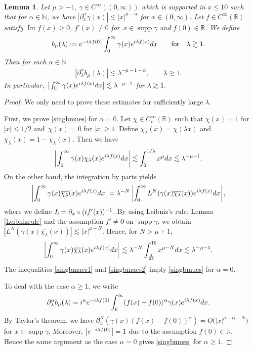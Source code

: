 \documentclass[10pt,a4paper]{article}
\numberwithin{equation}{section}
\newtheorem{Lemma}[Theorem]{Lemma}
\def\R{\mathbb{R}}%
\DeclareMathOperator{\supp}{supp}%
\DeclareMathOperator{\im}{Im}%
\def\a{\alpha}
\def\c{\gamma}
\def\l{\lambda}
\def\m{\mu}
\def\pa{\partial}
\begin{document}
\begin{Lemma}\label{singularasym}
Let $\m>-1$, $\c\in C^{\infty}((0,\infty))$ which is supported in $x\leq 10$ such that for $\a\in\mathbb{N}$, we have $|\pa_x^{\a}\c(x)|\lesssim |x|^{\m-\a}$ for $x\in (0,\infty)$. Let $f\in C^{\infty}(\R)$ satisfy $\im f(x)\geq 0$, $f'(x)\neq 0$ for~${x\in \supp \c}$ and $f(0)\in \R$. We define
\begin{align*}
b_{\m}(\l):={\rm e}^{-{\rm i}\l f(0)}\int_{0}^{\infty}\c(x){\rm e}^{{\rm i}\l f(x)}{\rm d}x\qquad \text{for}\quad \l\gtrsim 1.
\end{align*}
Then for each $\a\in\mathbb{N}$
\begin{align}\label{singbmues}
|\partial_{\l}^{\a}b_{\m}(\l)|\lesssim \l^{-\m-1-\a},\qquad \l\gtrsim 1.
\end{align}
In particular, $\big|\int_{0}^{\infty}\c(x){\rm e}^{{\rm i}\l f(x)}{\rm d}x\big|\lesssim \l^{-\m-1}$ for $\l\gtrsim 1$.
\end{Lemma}

\begin{proof}
We only need to prove these estimates for sufficiently large $\l$.

First, we prove \eqref{singbmues} for $\a=0$. Let $\chi\in C_c^{\infty}(\R)$ such that $\chi(x)=1$ for $|x|\leq 1/2$ and~${\chi(x)=0}$ for $|x|\geq 1$. Define $\chi_{\l}(x)=\chi(\l x)$ and $\overline{\chi_\l}(x)=1-\chi_{\l}(x)$. Then we have
\begin{align}\label{singbmues1}
\left|\int_{0}^{\infty}\c(x)\chi_{\l}(x){\rm e}^{{\rm i}\l f(x)}{\rm d}x\right|\lesssim \int_{0}^{1/\l}x^{\m}{\rm d}x\lesssim {\l}^{-\m-1}.
\end{align}
On the other hand, the integration by parts yields
\begin{align*}
\left|\int_{0}^{\infty}\c(x)\overline{\chi_{\l}}(x){\rm e}^{{\rm i}\l f(x)}{\rm d}x\right|=\l^{-N}\left|\int_{0}^{\infty}L^N(\c(x)\overline{\chi_{\l}}(x)){\rm e}^{{\rm i}\l f(x)}{\rm d}x\right|,
\end{align*}
where we define $L=\pa_x\circ ({\rm i}f'(x))^{-1}$. By using Leibniz's rule, Lemma \ref{Leibnizrule} and the assumption $f'\neq 0$ on $\supp \c$, we obtain $|L^{N}(\c(x)\overline{\chi_\l}(x))|\lesssim |x|^{\m-N}$. Hence, for $N>\m+1$,
\begin{align}\label{singbmues2}
\left|\int_{0}^{\infty}\c(x)\overline{\chi_{\l}}(x){\rm e}^{{\rm i}\l f(x)}{\rm d}x\right|\lesssim \l^{-N}\int_{\frac{1}{2\l}}^{10}x^{\m-N}{\rm d}x \lesssim \l^{-\m-1}.
\end{align}
The inequalities \eqref{singbmues1} and \eqref{singbmues2} imply \eqref{singbmues} for $\a=0$.

To deal with the case $\a\geq 1$, we write
\begin{align*}
\pa_{\l}^{\a}b_{\m}(\l)={\rm i}^{\a}{\rm e}^{-{\rm i}\l f(0)}\int_0^{\infty}(f(x)-f(0))^{\a}\c(x){\rm e}^{{\rm i}\l f(x)}{\rm d}x.
\end{align*}
By Taylor's theorem, we have $\pa_x^{N}(\c(x)(f(x)-f(0))^{\a})=O\bigl(|x|^{\m+\a-N}\bigr)$ for $x\in \supp \c$. Moreover, $\big|{\rm e}^{-{\rm i}\l f(0)}\big|=1$ due to the assumption $f(0)\in \R$.
Hence the same argument as the case $\a=0$ gives \eqref{singbmues} for $\a\geq 1$.
\end{proof}
\end{document}
